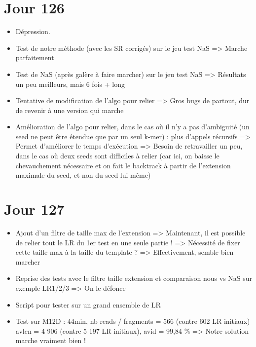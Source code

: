 \documentclass[12pt]{report}
\begin{document}
\section{Jour 126}

\begin{itemize}
	\item Dépression.
	
	\item Test de notre méthode (avec les SR corrigés) sur le jeu test NaS => Marche parfaitement
	
	\item Test de NaS (après galère à faire marcher) sur le jeu test NaS => Résultats un peu meilleurs, mais 6 fois + long
	
	\item Tentative de modification de l'algo pour relier => Gros bugs de partout, dur de revenir à une version qui marche
	
	\item Amélioration de l'algo pour relier, dans le cas où il n'y a pas d'ambiguité (un seed ne peut être étendue que par un seul k-mer) : plus d'appels 
		  récursifs
		  => Permet d'améliorer le temps d'exécution
		  => Besoin de retravailler un peu, dans le cas où deux seeds sont difficiles à relier (car ici, on baisse le chevauchement
		  nécessaire et on fait le backtrack à partir de l'extension maximale du seed, et non du seed lui même)
\end{itemize}

\section{Jour 127}

\begin{itemize}
	\item Ajout d'un filtre de taille max de l'extension
		  => Maintenant, il est possible de relier tout le LR du 1er test en une seule partie !
		  => Nécessité de fixer cette taille max à la taille du template ?
		  => Effectivement, semble bien marcher
		  
	\item Reprise des tests avec le filtre taille extension et comparaison nous vs NaS sur exemple LR1/2/3 => On le défonce
	
	\item Script pour tester sur un grand ensemble de LR
	
	\item Test sur M12D : 44min, nb reads / fragments = 566 (contre 602 LR initiaux) avlen = 4 906 (contre 5 197 LR initiaux), avid = 99,84 \%
		  => Notre solution marche vraiment bien !
\end{itemize}
\end{document}
